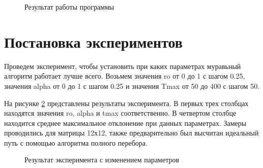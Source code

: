 \begin{figure}[h]
	\caption{Результат работы программы}
	\label{results2}
\end{figure}

\section{Постановка экспериментов}

Проведем эксперимент, чтобы установить при каких параметрах муравьный алгоритм работает лучше всего. Возьмем значения ro от 0 до 1 с шагом 0.25, значения alpha от 0 до 1 с шагом 0.25 и значения Tmax от 50 до 400 с шагом 50.

На рисунке \ref{times} представлены результаты эксперимента. В первых трех столбцах находятся значения ro, alpha и tmax соответственно. В четвертом столбце находится среднее максимальное отклонение при данных параметрах. 
Замеры проводились для матрицы 12х12, также предварительно был высчитан идеальный путь с помощью алгоритма полного перебора.

\begin{figure}[h]
	\caption{Результат эксперимента с изменением параметров}
	\label{times}
\end{figure}

